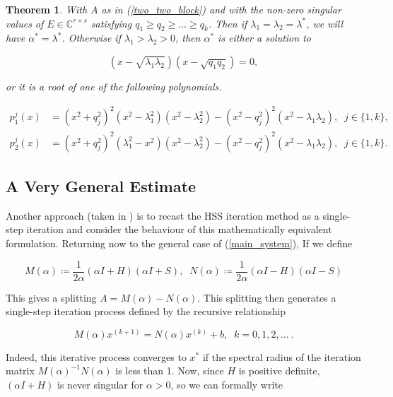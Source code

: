 \documentclass{article}
\newcommand{\bC}{\mathds{C}}
\newtheorem{theorem}{Theorem}[section]
\begin{document}
\begin{theorem}
    With $A$ as in (\ref{two_two_block}) and with the non-zero singular values of $E \in \bC^{r \times s}$  satisfying $q_1 \geq q_2 \geq \ldots \geq q_k$. Then if $\lambda_1 = \lambda_2 = \lambda^\ast$, we will have $\alpha^\ast = \lambda^\ast$. Otherwise if $\lambda_1 > \lambda_2 > 0$, then  $\alpha^\ast$ is either a solution to

    $$(x - \sqrt{\lambda_1\lambda_2})(x - \sqrt{q_1q_2}) = 0,$$

    or it is a root of one of the following polynomials.

    \begin{align*}
        p_1^j(x) &= (x^2 + q_j^2)^2(x^2 - \lambda_1^2)(x^2-\lambda_2^2) - (x^2-q_j^2)^2(x^2-\lambda_1\lambda_2), \; \; j \in \{1,k\},\\
        p_2^j(x) &= (x^2 + q_j^2)^2(\lambda_1^2-x^2)(x^2-\lambda_2^2) - (x^2-q_j^2)^2(x^2-\lambda_1\lambda_2), \; \; j \in \{1, k\}.
    \end{align*}
\end{theorem}

\subsection{A Very General Estimate}

Another approach (taken in \cite{HUANG2014142}) is to recast the HSS iteration method as a single-step iteration and consider the behaviour of this mathematically equivalent formulation. Returning now to the general case of (\ref{main_system}), If we define

\begin{equation}\label{N_alpha_introduce}
    M(\alpha) \coloneqq \frac{1}{2\alpha}(\alpha I + H)(\alpha I + S), \; \; N(\alpha) \coloneqq \frac{1}{2\alpha}(\alpha I - H)(\alpha I - S)
\end{equation}

This gives a splitting $A = M(\alpha) - N(\alpha)$. This splitting then generates a single-step iteration process defined by the recursive relationship

\begin{equation}
    M(\alpha)x^{(k+1)} = N(\alpha) x^{(k)} + b, \; \; k = 0, 1, 2, \ldots \: .
\end{equation}

Indeed, this iterative process converges to $x^\ast$ if the spectral radius of the iteration matrix $M(\alpha)^{-1}N(\alpha)$ is less than 1. Now, since $H$ is positive definite, $(\alpha I + H)$ is never singular for $\alpha >0$, so we can formally write
\end{document}
